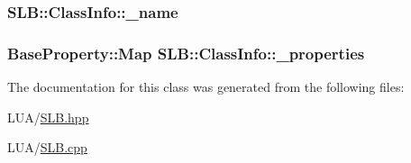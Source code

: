 \subsubsection[{\texorpdfstring{\+\_\+name}{_name}}]{ S\+L\+B\+::\+Class\+Info\+::\+\_\+name\hspace{0.3cm}{\ttfamily [protected]}}\hypertarget{classSLB_1_1ClassInfo_a96abb0f63b7591a5bb1398ca8340e383}{}\label{classSLB_1_1ClassInfo_a96abb0f63b7591a5bb1398ca8340e383}
\subsubsection[{\texorpdfstring{\+\_\+properties}{_properties}}]{\setlength{\rightskip}{0pt plus 5cm}Base\+Property\+::\+Map S\+L\+B\+::\+Class\+Info\+::\+\_\+properties\hspace{0.3cm}{\ttfamily [protected]}}\hypertarget{classSLB_1_1ClassInfo_aca934d887b4f2a249401a1d679f9cea8}{}\label{classSLB_1_1ClassInfo_aca934d887b4f2a249401a1d679f9cea8}


The documentation for this class was generated from the following files\+:\begin{DoxyCompactItemize}
\item 
L\+U\+A/\hyperlink{SLB_8hpp}{S\+L\+B.\+hpp}\item 
L\+U\+A/\hyperlink{SLB_8cpp}{S\+L\+B.\+cpp}\end{DoxyCompactItemize}
